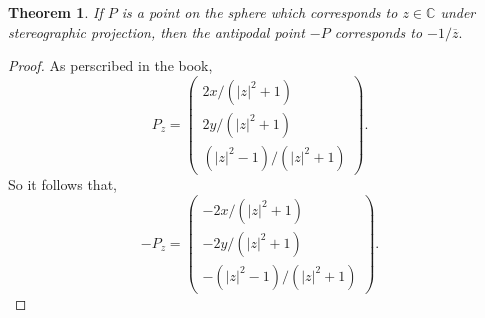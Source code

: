 \documentclass[letter]{article}
\newtheorem{theorem}{Theorem}
\newenvironment{menumerate}{%
  \edef\backupindent{\the\parindent}%
  \enumerate%
  \setlength{\parindent}{\backupindent}%
}{\endenumerate}
\begin{document}
\begin{menumerate}
\begin{theorem}
        If $P$ is a point on the sphere which corresponds to $z \in \mathbb{C}$ under stereographic projection,
        then the antipodal point $-P$ corresponds to $-1/\overline{z}.$
    \end{theorem}
    \begin{proof}
        As perscribed in the book, 
        \begin{equation}
         P_z = \left(
        \begin{array}{c}
        2x/(|z|^2 +1)\\
        2y/(|z|^2+1)\\
        (|z|^2 -1)/(|z|^2 + 1)
        \end{array}
        \right).
         \end{equation} 
         So it follows that, 
                 \begin{equation}
         -P_z = \left(
        \begin{array}{c}
        -2x/(|z|^2 +1)\\
        -2y/(|z|^2+1)\\
        -(|z|^2 -1)/(|z|^2 + 1)
        \end{array}
        \right).
         \end{equation} 


\end{proof}
\end{menumerate}
\end{document}
